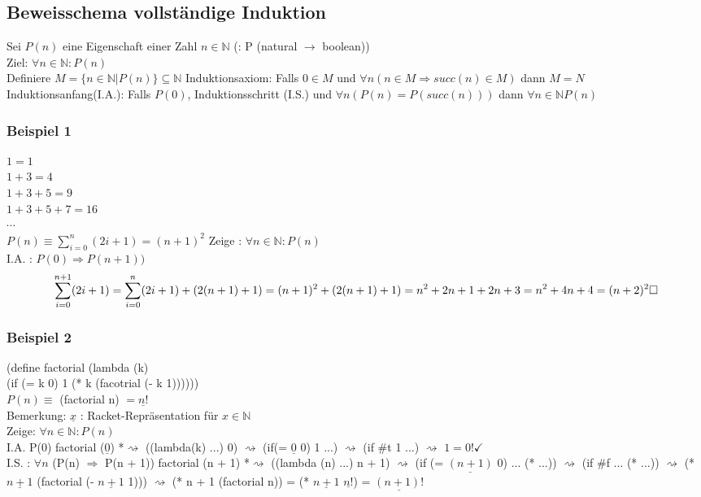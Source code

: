 \documentclass[a4paper, 20pt, openany]{book}
\begin{document}
\subsection{Beweisschema vollständige Induktion}
Sei $P(n)$ eine Eigenschaft einer Zahl $n \in \mathbb{N}$ (: P (natural $\rightarrow$ boolean))\\
Ziel: $\forall n \in \mathbb{N}: P(n)$\\
Definiere $M = \lbrace n\in \mathbb{N} | P(n) \rbrace \subseteq \mathbb{N}$
Induktionsaxiom:
Falls $0 \in M$ und $\forall n( n\in M \Rightarrow succ (n) \in M)$ dann $M = N$\\
Induktionsanfang(I.A.): Falls $P(0)$, Induktionsschritt (I.S.) und $\forall n (P(n) = P(succ(n)))$ dann $\forall n \in \mathbb{N} P(n)$

\subsubsection{Beispiel 1}
$1 = 1$\\
$1 + 3 = 4$\\
$1 + 3 + 5 = 9$\\
$1 + 3 + 5 + 7 = 16$\\
$\cdots$\\
$P(n) \equiv \sum \limits_{i = 0}^{n} (2i + 1) = (n+1)^2$
Zeige : $\forall n \in \mathbb{N} : P(n)$\\
I.A. : $P(0) \Rightarrow P(n+1))$
\begin{equation}
 \sum \limits_{i = 0}^{n +1} (2i + 1) = \sum \limits_{i = 0}^{n} (2i + 1) + (2(n+1) +1) \\ 
 = (n+1)^2 + (2(n+1)+1)\\
 = n^2 + 2n + 1 + 2n +3 \\
 = n^2 + 4n +4\\
 = (n+2)^2 \square
\end{equation}

\subsubsection{Beispiel 2}
(define factorial (lambda (k)\\
(if (= k 0) 1 (* k (facotrial (- k 1))))))\\
$P(n) \equiv$ (factorial n) $ = \underline{n!}$	\\
 Bemerkung: $\underline{x}$ : Racket-Repräsentation für $x \in \mathbb{N}$\\
 Zeige: $\forall n \in \mathbb{N}: P(n)$\\
 I.A. P(0) factorial ($\underline{0}$)
 *$\rightsquigarrow$ ((lambda(k) ...) 0)  $\rightsquigarrow$  (if(= $\underline{0}$ 0) 1 ...)  $\rightsquigarrow$ (if \#t 1 ...)  $\rightsquigarrow$ $1= 0! \checkmark$\\
 I.S. : $\forall n$ (P(n) $\Rightarrow$ P(n + 1)) factorial (n + 1) *$\rightsquigarrow$ ((lambda (n) ...) n + 1) $\rightsquigarrow$ (if (= $\underline{(n + 1)}$ 0) ... (* ...)) $\rightsquigarrow$ (if \#f ... (* ...)) $\rightsquigarrow$ (* $\underline{n + 1}$ (factorial (- $\underline{n + 1}$ 1))) $\rightsquigarrow$ (* n + 1 (factorial n)) = (* $\underline{n + 1}$ $\underline{n!}$) = $\underline{(n + 1)!}$
\end{document}

